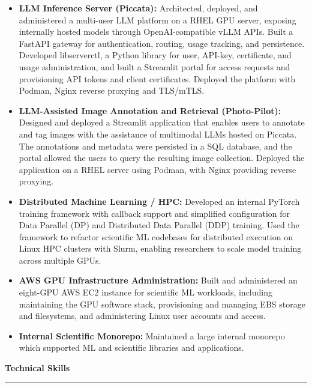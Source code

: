 \documentclass[11pt]{article}
\begin{document}
\begin{itemize}[leftmargin=*,nosep]
  \item \textbf{LLM Inference Server (Piccata):}
    Architected, deployed, and administered a multi-user LLM platform on a RHEL
    GPU server, exposing internally hosted models through OpenAI-compatible
    vLLM APIs. Built a FastAPI gateway for authentication, routing, usage
    tracking, and persistence. Developed libserverctl, a Python library for
    user, API-key, certificate, and usage administration, and built a Streamlit
    portal for access requests and provisioning API tokens and client
    certificates. Deployed the platform with Podman, Nginx reverse proxying and
    TLS/mTLS.

  \item \textbf{LLM-Assisted Image Annotation and Retrieval (Photo-Pilot):}
    Designed and deployed a Streamlit application that enables users to
    annotate and tag images with the assistance of multimodal LLMs hosted on
    Piccata. The annotations and metadata were persisted in a SQL database, and
    the portal allowed the users to query the resulting image collection.
    Deployed the application on a RHEL server using Podman, with Nginx
    providing reverse proxying.

  \item \textbf{Distributed Machine Learning / HPC:}
    Developed an internal PyTorch training framework with callback support and
    simplified configuration for Data Parallel (DP) and Distributed Data
    Parallel (DDP) training. Used the framework to refactor scientific ML
    codebases for distributed execution on Linux HPC clusters with Slurm,
    enabling researchers to scale model training across multiple GPUs.

  \item \textbf{AWS GPU Infrastructure Administration:}
    Built and administered an eight-GPU AWS EC2 instance for scientific ML
    workloads, including maintaining the GPU software stack, provisioning and
    managing EBS storage and filesystems, and administering Linux user accounts
    and access.

  \item \textbf{Internal Scientific Monorepo:}
    Maintained a large internal monorepo which supported ML and scientific
    libraries and applications.

\end{itemize}

\textbf{\Large Technical Skills} \vspace{.2em} \hrule
\end{document}
